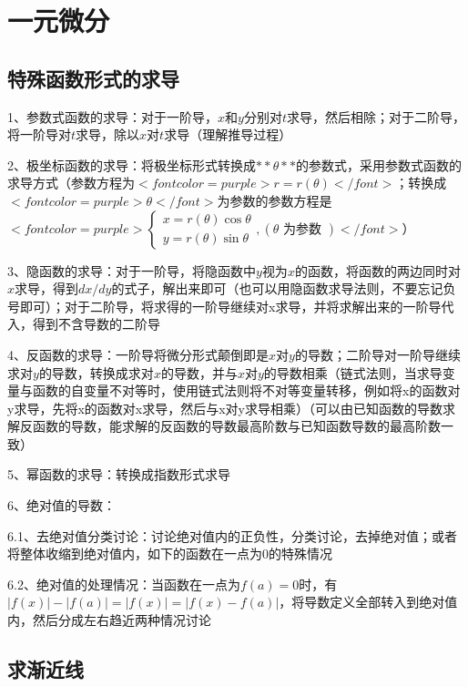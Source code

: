 \chapter{一元微分}

\section{特殊函数形式的求导}

1、参数式函数的求导：对于一阶导，$ x $和$ y $分别对$ t $求导，然后相除；对于二阶导，将一阶导对$ t $求导，除以$ x $对$ t $求导（理解推导过程）

2、极坐标函数的求导：将极坐标形式转换成$ **\theta** $的参数式，采用参数式函数的求导方式（参数方程为$ <font color=purple>r=r(\theta)</font> $；转换成$ <font color=purple>\theta</font> $为参数的参数方程是$ <font color=purple>\left\{\begin{array}{l}x=r(\theta) \cos \theta \\y=r(\theta) \sin \theta\end{array},(\theta \text { 为参数 })\right.</font> $）

3、隐函数的求导：对于一阶导，将隐函数中$ y $视为$ x $的函数，将函数的两边同时对$ x $求导，得到$ dx/dy $的式子，解出来即可（也可以用隐函数求导法则，不要忘记负号即可）；对于二阶导，将求得的一阶导继续对x求导，并将求解出来的一阶导代入，得到不含导数的二阶导

4、反函数的求导：一阶导将微分形式颠倒即是$ x $对$ y $的导数；二阶导对一阶导继续求对$ y $的导数，转换成求对$ x $的导数，并与$ x $对$ y $的导数相乘（链式法则，当求导变量与函数的自变量不对等时，使用链式法则将不对等变量转移，例如将x的函数对y求导，先将x的函数对x求导，然后与x对y求导相乘）（可以由已知函数的导数求解反函数的导数，能求解的反函数的导数最高阶数与已知函数导数的最高阶数一致）

5、幂函数的求导：转换成指数形式求导

6、绝对值的导数：

6.1、去绝对值分类讨论：讨论绝对值内的正负性，分类讨论，去掉绝对值；或者将整体收缩到绝对值内，如下的函数在一点为0的特殊情况

6.2、绝对值的处理情况：当函数在一点为$ f(a)=0 $时，有$ |f(x)|-|f(a)|=|f(x)|=|f(x)-f(a)| $，将导数定义全部转入到绝对值内，然后分成左右趋近两种情况讨论

\section{求渐近线}



